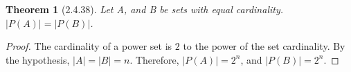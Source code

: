\documentclass[a4paper, 12pt]{article}
\theoremstyle{plain}
\newtheorem*{theorem*}{Theorem}
\begin{document}
	
	\begin{theorem*}[2.4.38]
		Let A, and B be sets with equal cardinality. \newline $|P(A)| = |P(B)|$. 
	\end{theorem*}
	
	\begin{proof}
		The cardinality of a power set is $2$ to the power of the set cardinality. By the hypothesis, $|A| = |B| = n$. Therefore, $|P(A)| = 2^{n}$, and \newline $|P(B)| = 2^{n}$.
	\end{proof}
\end{document}
